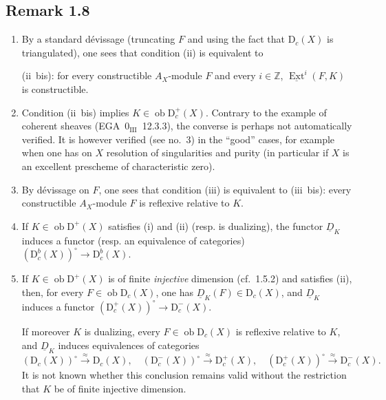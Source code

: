 \documentclass[11pt]{article}
\DeclareMathOperator{\Ext}{Ext}
\newcommand{\D}{\mathrm{D}}
\newcommand{\Z}{\mathbb{Z}}
\newcommand{\ob}{\operatorname{ob}}
\begin{document}
\subsection*{Remark 1.8}
\begin{enumerate}[label=\alph*)]
\item By a standard dévissage (truncating $F$ and using the fact that $\D_c(X)$ is triangulated), one sees that condition (ii) is equivalent to

(ii~bis): for every constructible $A_X$-module $F$ and every $i \in \Z$, $\underline{\Ext}^i(F,K)$ is constructible.

\item Condition (ii~bis) implies $K \in \ob \D_c^{+}(X)$. Contrary to the example of coherent sheaves (EGA~$0_{\mathrm{III}}$~12.3.3), the converse is perhaps not automatically verified. It is however verified (see no.~3) in the ``good'' cases, for example when one has on $X$ resolution of singularities and purity (in particular if $X$ is an excellent prescheme of characteristic zero).

\item By dévissage on $F$, one sees that condition (iii) is equivalent to (iii~bis): every constructible $A_X$-module $F$ is reflexive relative to $K$.

\item If $K \in \ob \D^{+}(X)$ satisfies (i) and (ii) (resp. is dualizing), the functor $\underline{D}_K$ induces a functor (resp. an equivalence of categories) $(\D_c^{b}(X))^{\circ} \to \D_c^{b}(X)$.

\item If $K \in \ob \D^{+}(X)$ is of finite \emph{injective} dimension (cf.~1.5.2) and satisfies (ii), then, for every $F \in \ob \D_c(X)$, one has $\underline{D}_K(F) \in \D_c(X)$, and $\underline{D}_K$ induces a functor $(\D_c^{+}(X))^{\circ} \to \D_c^{-}(X)$.

If moreover $K$ is dualizing, every $F \in \ob \D_c(X)$ is reflexive relative to $K$, and $\underline{D}_K$ induces equivalences of categories
\[
(\D_c(X))^{\circ} \xrightarrow{\approx} \D_c(X), \quad (\D_c^{-}(X))^{\circ} \xrightarrow{\approx} \D_c^{+}(X), \quad (\D_c^{+}(X))^{\circ} \xrightarrow{\approx} \D_c^{-}(X).
\]
It is not known whether this conclusion remains valid without the restriction that $K$ be of finite injective dimension.
\end{enumerate}
\end{document}

